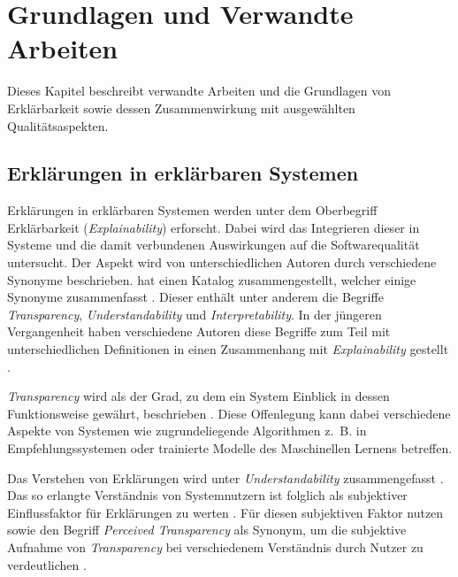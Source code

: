 \chapter{Grundlagen und Verwandte Arbeiten}

Dieses Kapitel beschreibt verwandte Arbeiten und die Grundlagen von Erklärbarkeit sowie dessen Zusammenwirkung mit ausgewählten Qualitätsaspekten.

\section{Erklärungen in erklärbaren Systemen}
\label{02_basics:explainable_system}

Erklärungen in erklärbaren Systemen werden unter dem Oberbegriff Erklärbarkeit (\textit{Explainability}) erforscht. Dabei wird das Integrieren dieser in Systeme und die damit verbundenen Auswirkungen auf die Softwarequalität untersucht. Der Aspekt wird von unterschiedlichen Autoren durch verschiedene Synonyme beschrieben. \citeauthor{brennen_what_2020} hat einen Katalog zusammengestellt, welcher einige Synonyme zusammenfasst \cite{brennen_what_2020}. Dieser enthält unter anderem die Begriffe
\textit{Transparency}, \textit{Understandability} und \textit{Interpretability}. In der jüngeren Vergangenheit haben verschiedene Autoren diese Begriffe zum Teil mit unterschiedlichen Definitionen in einen Zusammenhang mit \textit{Explainability} gestellt \cite{chazette_end-users_nodate,chazette_knowledge_nodate,kohl_explainability_2019,wang_integration_2020}.

\textit{Transparency} wird als der Grad, zu dem ein System Einblick in dessen Funktionsweise gewährt, beschrieben \cite{chazette_end-users_nodate}. Diese Offenlegung kann dabei verschiedene Aspekte von Systemen wie zugrundeliegende Algorithmen z.~B. in Empfehlungssystemen \cite{balog_measuring_2020} oder trainierte Modelle des Maschinellen Lernens \cite{sovrano_modelling_2020} betreffen.

Das Verstehen von Erklärungen wird unter \textit{Understandability} zusammengefasst \cite{do2010software}. Das so erlangte Verständnis von Systemnutzern ist folglich als subjektiver Einflussfaktor für Erklärungen zu werten \cite{chazette_end-users_nodate}. Für diesen subjektiven Faktor nutzen \citeauthor{wang_integration_2020} sowie \citeauthor{balog_measuring_2020} den Begriff \textit{Perceived Transparency} als Synonym, um die subjektive Aufnahme von \textit{Transparency} bei verschiedenem Verständnis durch Nutzer zu verdeutlichen \cite{wang_integration_2020, balog_measuring_2020}.


